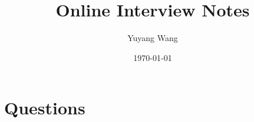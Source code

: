 


\title{Online Interview Notes}

\author{Yuyang Wang}
\date{\today}
\makeatletter
\fancyfoot[L]{\scshape \MakeLowercase{\@author}}
\fancyfoot[R]{{\scshape \MakeLowercase{\@title}}\quad{\LARGE\sfrac{\thepage}{\pageref*{LastPage}}}}
\makeatother



\maketitle%
\thispagestyle{fancy}

\section{Questions}


